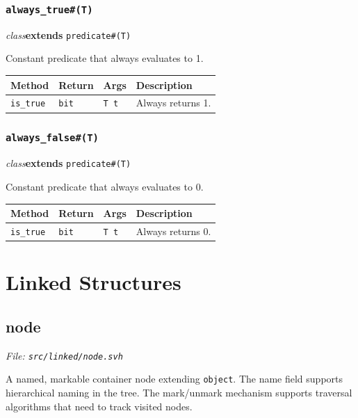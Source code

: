 \documentclass[11pt,letterpaper]{report}
\begin{document}
\subsection*{\texttt{always\_true\#(T)}}
\noindent\small\textit{class}\quad \textbf{extends} \texttt{predicate\#(T)}\par

Constant predicate that always evaluates to 1.

\begin{xltabular}{\linewidth}{>{\small}p{1.35in} >{\small}p{1.25in} >{\small}p{0.95in} >{\small}X}
\toprule
\textbf{Method} & \textbf{Return} & \textbf{Args} & \textbf{Description} \\
\midrule
\endhead
\bottomrule
\endfoot
\texttt{is\_true} & \texttt{bit} & \texttt{T t} & Always returns 1. \\
\end{xltabular}

\subsection*{\texttt{always\_false\#(T)}}
\noindent\small\textit{class}\quad \textbf{extends} \texttt{predicate\#(T)}\par

Constant predicate that always evaluates to 0.

\begin{xltabular}{\linewidth}{>{\small}p{1.35in} >{\small}p{1.25in} >{\small}p{0.95in} >{\small}X}
\toprule
\textbf{Method} & \textbf{Return} & \textbf{Args} & \textbf{Description} \\
\midrule
\endhead
\bottomrule
\endfoot
\texttt{is\_true} & \texttt{bit} & \texttt{T t} & Always returns 0. \\
\end{xltabular}

\chapter{Linked Structures}
\section{node}
\noindent\small\textit{File: \texttt{src/linked/node.svh}}\par

A named, markable container node extending \texttt{object}. The name field supports hierarchical naming in the tree. The mark/unmark mechanism supports traversal algorithms that need to track visited nodes.
\end{document}
